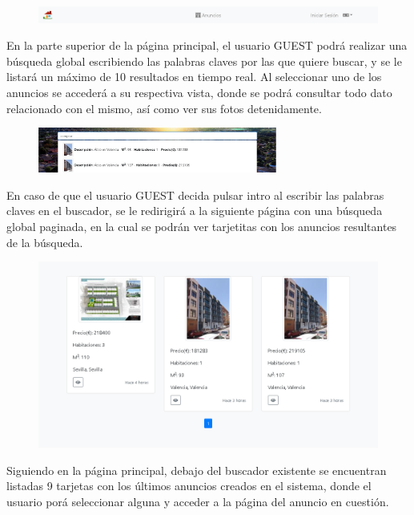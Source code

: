 \begin{figure}[h!]
\centering
\includegraphics[width=1\textwidth]{Img/ManualUsuario/NAV_GUEST.png}
\end{figure}


En la parte superior de la p\'{a}gina principal, el usuario GUEST podr\'{a} realizar una b\'{u}squeda global escribiendo las palabras claves por las que quiere buscar, y se le listar\'{a} un m\'{a}ximo de 10 resultados en tiempo real. Al seleccionar uno de los anuncios se acceder\'{a} a su respectiva vista, donde se podr\'{a} consultar todo dato relacionado con el mismo, as\'{i} como ver sus fotos detenidamente.

\begin{figure}[h!]
\centering
\includegraphics[width=0.7\textwidth]{Img/ManualUsuario/GLOBAL_SEARCH_GUEST.jpg}
\end{figure}


En caso de que el usuario GUEST decida pulsar intro al escribir las palabras claves en el buscador, se le redirigir\'{a} a la siguiente p\'{a}gina con una b\'{u}squeda global paginada, en la cual se podr\'{a}n ver tarjetitas con los anuncios resultantes de la b\'{u}squeda.

\begin{figure}[h!]
\centering
\includegraphics[width=.7\textwidth]{Img/ManualUsuario/GLOBAL_SEARCH_ENTER.png}
\end{figure}

Siguiendo en la p\'{a}gina principal, debajo del buscador existente se encuentran listadas 9 tarjetas con los \'{u}ltimos anuncios creados en el sistema, donde el usuario por\'{a} seleccionar alguna y acceder a la p\'{a}gina del anuncio en cuesti\'{o}n.


